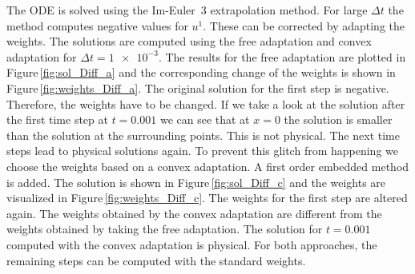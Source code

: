 \documentclass[a4paper]{article}
\numberwithin{equation}{section}
\theoremstyle{plain}
\theoremstyle{definition}
\numberwithin{theorem}{section}
\newcommand{\dt}{{\Delta t}}
\newcommand{\1}{\mathbbm{1}}
\begin{document}
The ODE is solved using the Im-Euler~3 extrapolation method.
For large $\dt$ the method computes negative values for $u^1$.
These can be corrected by adapting the weights.
The solutions are computed using the free adaptation and convex adaptation for $\dt = \num{1e-3}$.
The results for the free adaptation are plotted in Figure\,\ref{fig:sol_Diff_a} and the corresponding change of the weights
is shown in Figure\,\ref{fig:weights_Diff_a}.
The original solution for the first step is negative. Therefore, the weights have to be changed.
If we take a look at the solution after the first time step at $t=0.001$ we can see that at $x=0$ the solution is smaller than the solution at the surrounding points.
This is not physical.
The next time steps lead to physical solutions again.
To prevent this glitch from happening we choose the weights based on a convex adaptation.
A first order embedded method is added. The solution is shown in Figure\,\ref{fig:sol_Diff_c} and the weights are visualized in Figure\,\ref{fig:weights_Diff_c}.
The weights for the first step are altered again.
The weights obtained by the convex adaptation are different from the weights obtained
by taking the free adaptation.
The solution for $t=0.001$ computed with the convex adaptation is physical.
For both approaches, the remaining steps can be computed with the standard weights.
\end{document}
